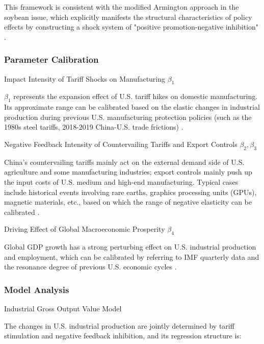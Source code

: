\documentclass{apmcmthesis}
\begin{document}
This framework is consistent with the modified Armington approach in the soybean issue, which explicitly manifests the structural characteristics of policy effects by constructing a shock system of "positive promotion-negative inhibition" \cite{hudsonbay2025guide}.

\subsubsection{Parameter Calibration}

\item[Impact Intensity of Tariff Shocks on Manufacturing $\beta_1$]

$\beta_1$ represents the expansion effect of U.S. tariff hikes on domestic manufacturing. Its approximate range can be calibrated based on the elastic changes in industrial production during previous U.S. manufacturing protection policies (such as the 1980s steel tariffs, 2018-2019 China-U.S. trade frictions) \cite{piie2025tariff}.

\item[Negative Feedback Intensity of Countervailing Tariffs and Export Controls $\beta_2,\beta_3$]

China's countervailing tariffs mainly act on the external demand side of U.S. agriculture and some manufacturing industries; export controls mainly push up the input costs of U.S. medium and high-end manufacturing. Typical cases include historical events involving rare earths, graphics processing units (GPUs), magnetic materials, etc., based on which the range of negative elasticity can be calibrated \cite{worldbank2025prospects}.

\item[Driving Effect of Global Macroeconomic Prosperity $\beta_4$]

Global GDP growth has a strong perturbing effect on U.S. industrial production and employment, which can be calibrated by referring to IMF quarterly data and the resonance degree of previous U.S. economic cycles \cite{imf2025weo}.

\subsubsection{Model Analysis}

\item[Industrial Gross Output Value Model]

The changes in U.S. industrial production are jointly determined by tariff stimulation and negative feedback inhibition, and its regression structure is:
\end{document}
